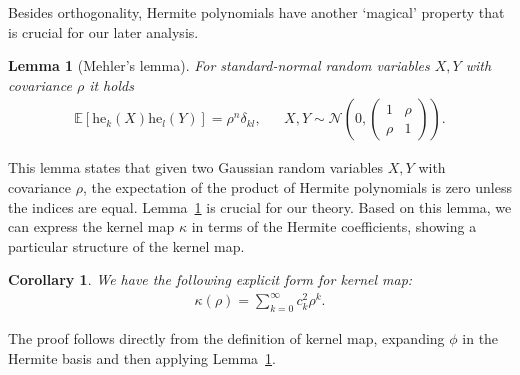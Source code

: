 \documentclass[twoside]{article}
\newcommand{\E}{\mathbb{E}}
\newcommand{\he}{\mathrm{he}}
\newtheorem{lemma}{Lemma}
\newtheorem{corollary}{Corollary}
\theoremstyle{definition}
\newcommand{\thomas}[1]{{\color{blue}TH:  \textit{#1}}}
\begin{document}

Besides orthogonality, Hermite polynomials have another `magical' property that is crucial for our later analysis. 

\begin{lemma}[Mehler's lemma]\label{lem:mehler_kernel}
For standard-normal random variables $X,Y$ with covariance $\rho$ it holds
\begin{align*}
\E\left[\he_k(X)\he_l(Y)\right] = \rho^n \delta_{kl}, && X, Y\sim \mathcal N\left(0, \begin{pmatrix} 1 & \rho \\ \rho & 1 \end{pmatrix}
 \right).
\end{align*}
\end{lemma}

This lemma states that given two Gaussian random variables $X, Y$ with covariance $\rho$, the expectation of the product of Hermite polynomials is zero unless the indices are equal. 
Lemma~\ref{lem:mehler_kernel} is crucial for our theory. Based on this lemma, we can express the kernel map $\kappa$ in terms of the Hermite coefficients, showing a particular structure of the kernel map.

\begin{corollary}
    \label{cor:hermite_covariance}
    \label{cor:kernel_map}
We have the following explicit form for kernel map:
\begin{align*}
\kappa(\rho) = \sum_{k=0}^\infty c_k^2 \rho^k.
\end{align*}
\end{corollary}

The proof follows directly from the definition of kernel map, expanding $\phi$ in the Hermite basis and then applying Lemma~\ref{lem:mehler_kernel}. 

\end{document}

